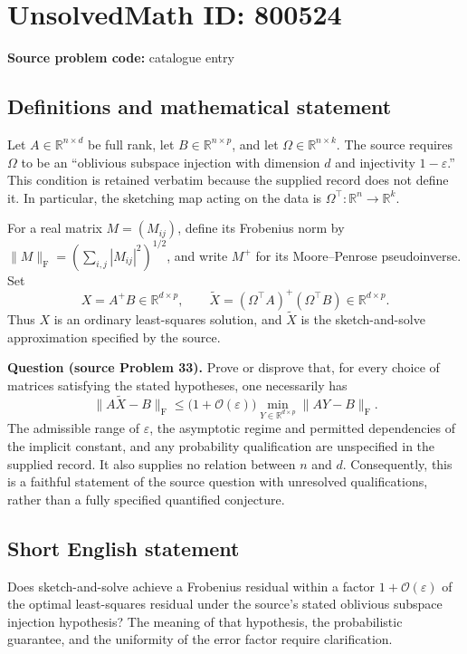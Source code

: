 \documentclass[11pt]{article}
\newcommand{\R}{\mathbb{R}}
\begin{document}
\section*{UnsolvedMath ID: 800524}
\textbf{Source problem code:} catalogue entry
\subsection{Definitions and mathematical statement}
Let \(A\in\R^{n\times d}\) be full rank, let \(B\in\R^{n\times p}\), and let \(\Omega\in\R^{n\times k}\). The source requires \(\Omega\) to be an ``oblivious subspace injection with dimension \(d\) and injectivity \(1-\varepsilon\).'' This condition is retained verbatim because the supplied record does not define it. In particular, the sketching map acting on the data is \(\Omega^\top:\R^n\to\R^k\).

For a real matrix \(M=(M_{ij})\), define its Frobenius norm by \(\|M\|_{\mathrm F}=(\sum_{i,j}|M_{ij}|^2)^{1/2}\), and write \(M^+\) for its Moore--Penrose pseudoinverse. Set
\[
X=A^+B\in\R^{d\times p},\qquad
\widetilde X=(\Omega^\top A)^+(\Omega^\top B)\in\R^{d\times p}.
\]
Thus \(X\) is an ordinary least-squares solution, and \(\widetilde X\) is the sketch-and-solve approximation specified by the source.

\textbf{Question (source Problem 33).} Prove or disprove that, for every choice of matrices satisfying the stated hypotheses, one necessarily has
\[
\|A\widetilde X-B\|_{\mathrm F}
\leq \bigl(1+\mathcal O(\varepsilon)\bigr)
\min_{Y\in\R^{d\times p}}\|AY-B\|_{\mathrm F}.
\]
The admissible range of \(\varepsilon\), the asymptotic regime and permitted dependencies of the implicit constant, and any probability qualification are unspecified in the supplied record. It also supplies no relation between \(n\) and \(d\). Consequently, this is a faithful statement of the source question with unresolved qualifications, rather than a fully specified quantified conjecture.
\subsection{Short English statement}
Does sketch-and-solve achieve a Frobenius residual within a factor \(1+\mathcal O(\varepsilon)\) of the optimal least-squares residual under the source's stated oblivious subspace injection hypothesis? The meaning of that hypothesis, the probabilistic guarantee, and the uniformity of the error factor require clarification.
\end{document}
